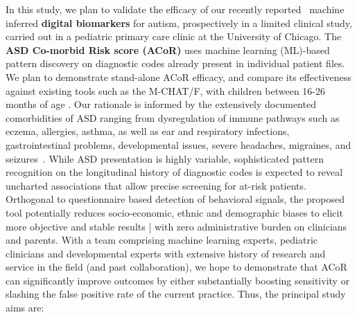 \documentclass[onecolumn, compsoc,11pt]{IEEEtran}
\def\acor{ACoR\xspace}
\begin{document}
In this study, we plan to validate the efficacy of our recently reported~\cite{Onishchenko_2021}  machine inferred \textbf{digital biomarkers} for autism, prospectively in a limited clinical study, carried out in a
pediatric primary care clinic at the University of Chicago. The \textbf{ ASD Co-morbid Risk score (\acor)} uses machine learning (ML)-based pattern discovery on diagnostic codes already present in individual patient files. We plan to demonstrate stand-alone \acor efficacy, and compare its effectiveness against existing  tools such as the M-CHAT/F, with children between 16-26 months of age . Our rationale is informed by the extensively documented comorbidities of ASD ranging from dysregulation of immune pathways such as eczema, allergies, asthma, as well as ear and respiratory infections, gastrointestinal problems, developmental issues, severe headaches, migraines, and seizures~\cite{pmid30733689,pmid22511918}. While ASD presentation is highly variable, sophisticated pattern recognition on the longitudinal history of  diagnostic codes is expected to reveal uncharted associations that allow precise screening for at-risk patients.
Orthogonal to  questionnaire based  detection of behavioral signals, the proposed tool potentially reduces socio-economic, ethnic and demographic biases to elicit more  objective and stable results |  with zero  administrative burden on clinicians and parents. With a team comprising machine learning experts, pediatric clinicians and developmental experts with extensive history of research and service in the field (and past collaboration), we hope to demonstrate that \acor can  significantly improve outcomes by either substantially boosting sensitivity  or slashing the false positive rate of the current practice.
%
Thus, the principal study aims are:
     
\end{document}

